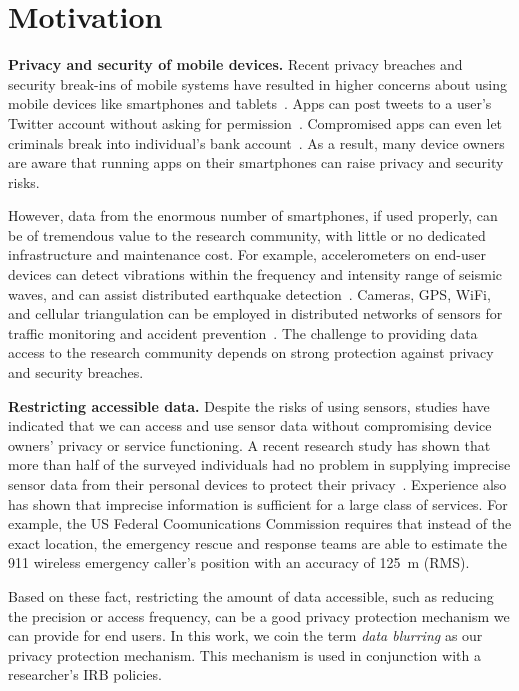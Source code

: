 \section{Motivation}\label{sec-motivation}

\textbf{Privacy and security of mobile devices.}
Recent privacy breaches and security break-ins of mobile systems 
have resulted in higher concerns about using mobile devices like 
smartphones and tablets~\cite{breach}. Apps can post tweets to a 
user's Twitter account without asking for permission~\cite{tweet}. 
Compromised apps can even let criminals break into individual's 
bank account~\cite{starbucks}. As a result, many device owners 
are aware that running apps on their smartphones can raise privacy 
and security risks. 

However, data from the enormous number of smartphones, 
if used properly, can be of tremendous value to the research 
community, with little or no dedicated infrastructure and maintenance 
cost. For example, accelerometers on end-user devices can 
detect vibrations within the frequency and intensity range of 
seismic waves, and can assist distributed earthquake 
detection~\cite{faulkner2011next}. Cameras, GPS, WiFi, and 
cellular triangulation can be employed in distributed networks 
of sensors for traffic monitoring and accident 
prevention~\cite{mohan2008nericell, thiagarajan2009vtrack}. 
The challenge to providing data access to the research community
depends on strong protection against privacy and security breaches.

\textbf{Restricting accessible data.}
Despite the risks of using sensors, 
studies have indicated that we can access and use sensor data 
without compromising device owners' privacy or service functioning.
A recent research study has shown that more than half of the 
surveyed individuals had no problem in supplying imprecise 
sensor data from their personal devices to protect their 
privacy~\cite{fawaz2014location}. Experience also has shown 
that imprecise information is sufficient for a large class of 
services. For example, the US Federal Coomunications 
Commission requires that instead of the exact location, the 
emergency rescue and response teams are able to estimate the 911 
wireless emergency caller's position with an accuracy of 125~m 
(RMS). 

Based on these fact, restricting 
the amount of data accessible, such as reducing the precision or 
access frequency, can be a good privacy protection mechanism we can 
provide for end users. In this work, we coin the term \textit{data blurring}
as our privacy protection mechanism. This mechanism is used in 
conjunction with a researcher's IRB policies. 

